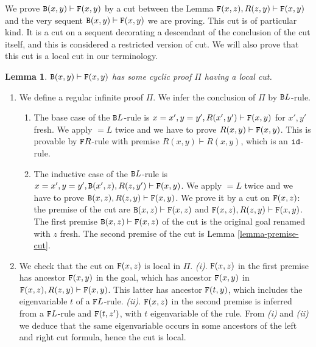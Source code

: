 \documentclass[a4paper,12pt]{article}
\newtheorem{lemma}[theorem]{Lemma}
\newenvironment{proof}[1][Proof]{\begin{trivlist}
\item[\hskip \labelsep {\bfseries #1}]}{\end{trivlist}}
\newcommand{\Backward}         { {\tt B} }
\newcommand{\Forward}         { {\tt F} }
\newcommand{\id}              { {\tt id} }
\newcommand{\eqL}     {= \! \!  \!  L}
\begin{document}
We prove $\Backward(x,y) \vdash \Forward(x,y)$ by a cut between the Lemma $\Forward(x,z), R(z,y) \vdash \Forward(x,y)$ and the very sequent $\Backward(x,y) \vdash \Forward(x,y)$ we are proving. This cut is of particular kind. It is a cut on a sequent decorating a descendant of the conclusion of the cut itself, and this is considered a restricted version of cut. We will also prove that this cut is a local cut in our terminology.  

\begin{lemma}
\label{lemma-cut-proof}
$\Backward(x,y) \vdash \Forward(x,y)$ has some cyclic proof $\Pi$ having a local cut. 
\end{lemma}
\begin{proof}
\begin{enumerate}

\item
We define a regular infinite proof $\Pi$. We infer the conclusion of $\Pi$ by $\Backward L$-rule.
\begin{enumerate}
\item
The base case of the $\Backward L$-rule is $x=x', y=y', R(x',y') \vdash \Forward(x,y)$ for $x',y'$ fresh. We apply $\eqL $ twice and we have to prove $R(x,y) \vdash \Forward(x,y)$. This is provable by $\Forward R$-rule with premise $R(x,y) \vdash R(x,y)$, which is an $\id$-rule.
\item
The inductive case of the $\Backward L$-rule is $x=x', y=y', \Backward(x',z), R(z,y') \vdash \Forward(x,y)$. We apply $\eqL $ twice and we have to prove $\Backward(x,z), R(z,y) \vdash \Forward(x,y)$. We prove it by a cut on $\Forward(x,z)$: the premise of the cut are $\Backward(x,z) \vdash \Forward(x,z)$ and $\Forward(x,z), R(z,y) \vdash \Forward(x,y)$. The first premise $\Backward(x,z) \vdash \Forward(x,z)$ of the cut is the original goal renamed with $z$ fresh. The second premise of the cut is Lemma \ref{lemma-premise-cut}.
\end{enumerate}

\item
We check that the cut on $\Forward(x,z)$ is local in $\Pi$. \emph{(i)}. $\Forward(x,z)$ in the first premise has ancestor $\Forward(x,y)$ in the goal, which has ancestor  $\Forward(x,y)$ in $\Forward(x,z), R(z,y) \vdash \Forward(x,y)$. This latter has ancestor $\Forward(t,y)$, which includes the eigenvariable $t$ of a $\Forward L$-rule. \emph{(ii)}. $\Forward(x,z)$ in the second premise is inferred from a $\Forward L$-rule and $\Forward(t,z')$, with $t$ eigenvariable of the rule. From \emph{(i)} and \emph{(ii)} we deduce that the same eigenvariable occurs in some ancestors of the left and right cut formula, hence the cut is local.


\end{enumerate}
\end{proof}
\end{document}
